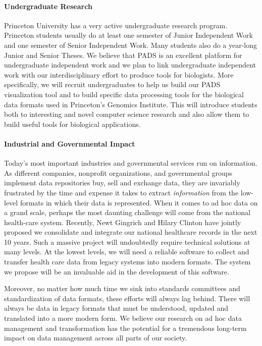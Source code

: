 \documentclass[11pt]{article}
\begin{document}
\paragraph*{Undergraduate Research}
Princeton University has a very active undergraduate research program.
Princeton students usually do at least one semester of
Junior Independent Work and one semester of Senior Independent Work. 
Many students also do a year-long
Junior and Senior Theses.  We believe that PADS is an excellent
platform for undergraduate independent work and we plan to link
undergraduate independent work with our interdisciplinary effort to
produce tools for biologists.
More specifically, we will recruit undergraduates to help us
build our PADS visualization tool and to build
specific data processing tools for the biological data formats
used in Princeton's Genomics Institute.
This will introduce students both to interesting and novel
computer science research and also allow them to build useful
tools for biological applications. 

\paragraph*{Industrial and Governmental Impact}
Today's most important industries and governmental services
run on information.  As different companies, nonprofit organizations,
and governmental groups implement data repositories buy, sell
and exchange data, they are invariably frustrated by the time and expense
it takes to extract {\em information} from the low-level
formats in which their data is represented.  
When it comes to ad hoc data on a grand scale,
perhaps the most daunting challenge will come from the national
health-care system.  Recently, Newt Gingrich and Hilary Clinton have
jointly proposed we consolidate and integrate our national healthcare
records in the next 10 years.  Such a massive project will undoubtedly
require technical solutions at many levels.  At the lowest levels, we
will need a reliable software to collect and transfer health care data
from legacy systems into modern formats.  The \datatype{} system we
propose will be an invaluable aid in the development of this software.

Moreover, no matter how much time we sink into standards committees
and standardization of data formats, these efforts will always lag
behind.  There will always be data in legacy formats that must be
understood, updated and translated into a more modern form.  We
believe our research on ad hoc data management and transformation has
the potential for a tremendous long-term impact on data management
across all parts of our society.
\end{document}
